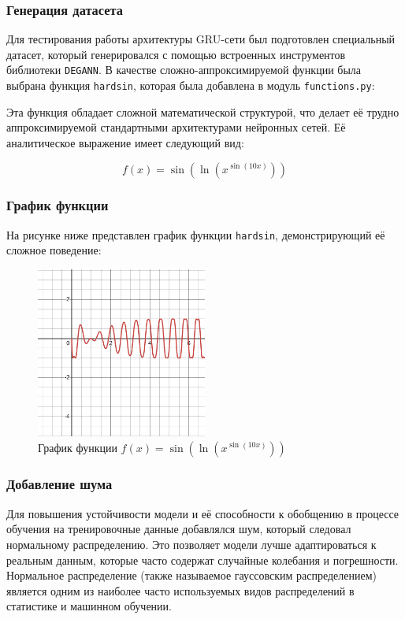 \subsubsection{Генерация датасета}
Для тестирования работы архитектуры GRU-сети был подготовлен специальный датасет, который генерировался с помощью встроенных инструментов библиотеки \texttt{DEGANN}. В качестве сложно-аппроксимируемой функции была выбрана функция \texttt{hardsin}, которая была добавлена в модуль \texttt{functions.py}:

Эта функция обладает сложной математической структурой, что делает её трудно аппроксимируемой стандартными архитектурами нейронных сетей. Её аналитическое выражение имеет следующий вид:

\[
f(x) = \sin\left(\ln(x^{\sin(10x)})\right)
\]

\subsubsection{График функции}
На рисунке ниже представлен график функции \texttt{hardsin}, демонстрирующий её сложное поведение:

\begin{figure}[H]
    \centering
    \includegraphics[width=0.5\textwidth]{figures/graph_hardsin.png}
    \caption{График функции $f(x) = \sin\left(\ln(x^{\sin(10x)})\right)$}
    \label{fig:hardsin_graph}
\end{figure}

\subsubsection{Добавление шума}

Для повышения устойчивости модели и её способности к обобщению в процессе обучения на тренировочные данные добавлялся шум, который следовал нормальному распределению. Это позволяет модели лучше адаптироваться к реальным данным, которые часто содержат случайные колебания и погрешности. Нормальное распределение (также называемое гауссовским распределением) является одним из наиболее часто используемых видов распределений в статистике и машинном обучении.


